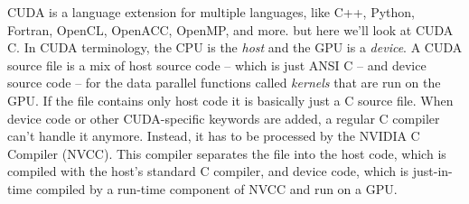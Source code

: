 \documentclass[8pt, table, xcdraw]{article}%
\begin{document}
CUDA is a language extension for multiple languages, like  C++, Python, Fortran, OpenCL, OpenACC, OpenMP, and more. but here we'll look at CUDA C. In CUDA terminology, the CPU is the \emph{host} and the GPU is a \emph{device}. A CUDA source file is a mix of host source code -- which is just ANSI C -- and device source code -- for the data parallel functions called \emph{kernels} that are run on the GPU. If the file contains only host code it is basically just a C source file. When device code or other CUDA-specific keywords are added, a regular C compiler can't handle it anymore. Instead, it has to be processed by the NVIDIA C Compiler (NVCC). This compiler separates the file into the host code, which is compiled with the host's standard C compiler, and device code, which is just-in-time compiled by a run-time component of NVCC and run on a GPU.
\end{document}
